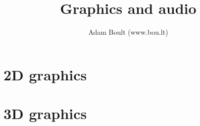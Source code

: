 \documentclass[oneside]{book}
\begin{document}
\author{Adam Boult (www.bou.lt)}
\title{Graphics and audio}
\maketitle

\setcounter{tocdepth}{0}
\tableofcontents



\part{2D graphics}







\part{3D graphics}






\end{document}
